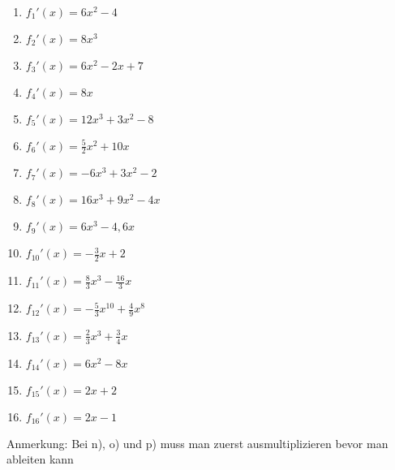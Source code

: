 \begin{Answer}[ref=summenregelA1]\\
	\begin{minipage}{\textwidth}
		\begin{minipage}{0.5\textwidth}
			\begin{enumerate}[label=\alph*)]
				\item \(f_1'(x)=6x^2-4\)
				\item \(f_2'(x)=8x^3\)
				\item \(f_3'(x)=6x^2-2x+7\)
				\item \(f_4'(x)=8x\)
				\item \(f_5'(x)=12x^3+3x^2-8\)
				\item \(f_6'(x)=\frac{5}{2}x^2+10x\)
				\item \(f_7'(x)=-6x^3+3x^2-2\)
				\item \(f_8'(x)=16x^3+9x^2-4x\)
			\end{enumerate}
		\end{minipage}%
		\begin{minipage}{0.5\textwidth}
			\begin{enumerate}[label=\alph*)]
				\setcounter{enumi}{8}
				\item \(f_9'(x)=6x^3-4,6x\)
				\item \(f_{10}'(x)=-\frac{3}{2}x+2\)
				\item \(f_{11}'(x)=\frac{8}{3}x^3-\frac{16}{3}x\)
				\item \(f_{12}'(x)=-\frac{5}{3}x^{10}+\frac{4}{9}x^8\)
				\item \(f_{13}'(x)=\frac{2}{3}x^3+\frac{3}{4}x\)
				\item \(f_{14}'(x)=6x^2-8x\)
				\item \(f_{15}'(x)=2x+2\)
				\item \(f_{16}'(x)=2x-1\)
			\end{enumerate}
		\end{minipage}%
	\end{minipage}

    \bigskip

	Anmerkung: Bei n), o) und p) muss man zuerst ausmultiplizieren bevor man ableiten kann
\end{Answer}